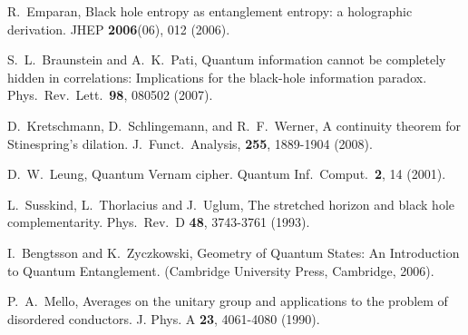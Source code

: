 \documentclass[aps,prl,amsmath,amssymb,floatfix,12pt]{revtex4}
\begin{document}
\begin{thebibliography}{18}
 R.\ Emparan,
Black hole entropy as entanglement entropy: a holographic derivation.
JHEP {\bf 2006}(06), 012 (2006).

 S.\ L.\ Braunstein and A.\ K.\ Pati,
Quantum information cannot be completely hidden in
correlations: Implications for the black-hole information paradox.
Phys.\ Rev.\ Lett.\ {\bf 98}, 080502 (2007).

 D.\ Kretschmann, D.\ Schlingemann, and R.\ F.\ Werner,
A continuity theorem for Stinespring's dilation.
J.\ Funct.\ Analysis, {\bf 255}, 1889-1904 (2008).

 D.\ W.\ Leung,
Quantum Vernam cipher.
Quantum Inf.\ Comput.\ {\bf 2}, 14 (2001).

 L.\ Susskind, L.\ Thorlacius and J.\ Uglum,
The stretched horizon and black hole complementarity.
Phys.\ Rev.\ D {\bf 48}, 3743-3761 (1993).

 I.\ Bengtsson and K.\ {Z}yczkowski,
Geometry of Quantum States: An Introduction to Quantum Entanglement.
(Cambridge University Press, Cambridge, 2006).

  P.\ A.\ Mello,
Averages on the unitary group and applications to the problem of
disordered conductors.
J. Phys. A {\bf 23}, 4061-4080 (1990).

\end{thebibliography}
\end{document}
